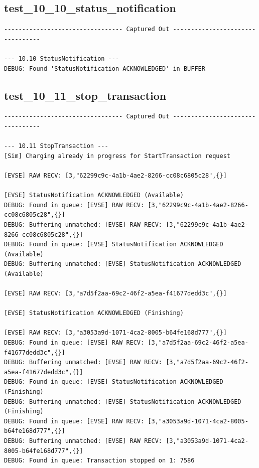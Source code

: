 \documentclass{article}
\begin{document}
\subsection*{test\_10\_10\_status\_notification}
\begin{lstlisting}
--------------------------------- Captured Out ---------------------------------

--- 10.10 StatusNotification ---
DEBUG: Found 'StatusNotification ACKNOWLEDGED' in BUFFER
\end{lstlisting}
\subsection*{test\_10\_11\_stop\_transaction}
\begin{lstlisting}
--------------------------------- Captured Out ---------------------------------

--- 10.11 StopTransaction ---
[Sim] Charging already in progress for StartTransaction request

[EVSE] RAW RECV: [3,"62299c9c-4a1b-4ae2-8266-cc08c6805c28",{}]

[EVSE] StatusNotification ACKNOWLEDGED (Available)
DEBUG: Found in queue: [EVSE] RAW RECV: [3,"62299c9c-4a1b-4ae2-8266-cc08c6805c28",{}]
DEBUG: Buffering unmatched: [EVSE] RAW RECV: [3,"62299c9c-4a1b-4ae2-8266-cc08c6805c28",{}]
DEBUG: Found in queue: [EVSE] StatusNotification ACKNOWLEDGED (Available)
DEBUG: Buffering unmatched: [EVSE] StatusNotification ACKNOWLEDGED (Available)

[EVSE] RAW RECV: [3,"a7d5f2aa-69c2-46f2-a5ea-f41677dedd3c",{}]

[EVSE] StatusNotification ACKNOWLEDGED (Finishing)

[EVSE] RAW RECV: [3,"a3053a9d-1071-4ca2-8005-b64fe168d777",{}]
DEBUG: Found in queue: [EVSE] RAW RECV: [3,"a7d5f2aa-69c2-46f2-a5ea-f41677dedd3c",{}]
DEBUG: Buffering unmatched: [EVSE] RAW RECV: [3,"a7d5f2aa-69c2-46f2-a5ea-f41677dedd3c",{}]
DEBUG: Found in queue: [EVSE] StatusNotification ACKNOWLEDGED (Finishing)
DEBUG: Buffering unmatched: [EVSE] StatusNotification ACKNOWLEDGED (Finishing)
DEBUG: Found in queue: [EVSE] RAW RECV: [3,"a3053a9d-1071-4ca2-8005-b64fe168d777",{}]
DEBUG: Buffering unmatched: [EVSE] RAW RECV: [3,"a3053a9d-1071-4ca2-8005-b64fe168d777",{}]
DEBUG: Found in queue: Transaction stopped on 1: 7586
\end{lstlisting}
\end{document}

